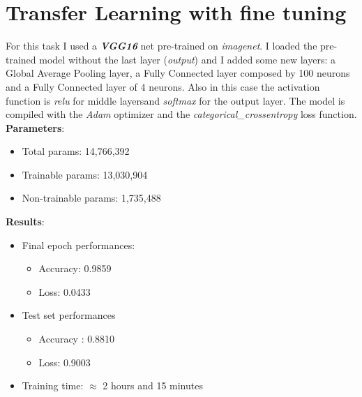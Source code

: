 \documentclass[11pt]{article}
\begin{document}
\section{Transfer Learning with fine tuning}
For this task I used a \textbf{\textit{VGG16}} net pre-trained on \textit{imagenet}. I loaded the pre-trained model without the last layer (\textit{output}) and I added some new layers: a Global Average Pooling layer, a Fully Connected layer composed by 100 neurons and a Fully Connected layer of 4 neurons. Also in this case the activation function is \textit{relu} for middle layersand \textit{softmax} for the output layer. The model is compiled with the \textit{Adam} optimizer and the \textit{categorical\_crossentropy} loss function.  \\
\textbf{Parameters}:
\begin{itemize}
	\item Total params: 14,766,392
	\item Trainable params: 13,030,904
	\item Non-trainable params: 1,735,488
\end{itemize}
\textbf{Results}:
\begin{itemize}
	\item Final epoch performances:
	\begin{itemize}
		\item Accuracy: 0.9859
		\item Loss: 0.0433
	\end{itemize}
	\item Test set performances
	\begin{itemize}
		\item Accuracy : 0.8810
		\item Loss: 0.9003
	\end{itemize}
	\item Training time: $\approx$ 2 hours and 15 minutes
\end{itemize}
\end{document}
